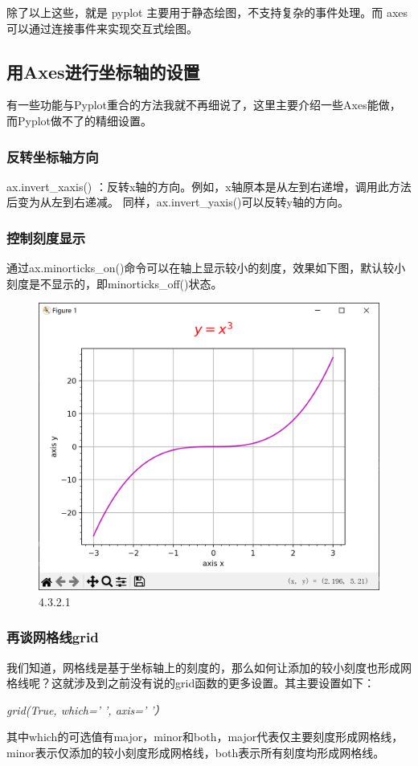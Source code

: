 \documentclass[12pt]{article}
\begin{document}
除了以上这些，就是 pyplot 主要用于静态绘图，不支持复杂的事件处理。而 axes 可以通过连接事件来实现交互式绘图。


\subsection{用Axes进行坐标轴的设置}
有一些功能与Pyplot重合的方法我就不再细说了，这里主要介绍一些Axes能做，而Pyplot做不了的精细设置。
\subsubsection{反转坐标轴方向}

ax.invert\_xaxis()  ：反转x轴的方向。例如，x轴原本是从左到右递增，调用此方法后变为从左到右递减。
同样，ax.invert\_yaxis()可以反转y轴的方向。

\subsubsection{控制刻度显示}

通过ax.minorticks\_on()命令可以在轴上显示较小的刻度，效果如下图，默认较小刻度是不显示的，即minorticks\_off()状态。
\begin{figure}[H]
    \centering
    \includegraphics[width=0.5\linewidth]{Axes控制坐标轴 Pic1.png}
    \caption{4.3.2.1}
    \label{fig:enter-label}
\end{figure}

\subsubsection{再谈网格线grid}
我们知道，网格线是基于坐标轴上的刻度的，那么如何让添加的较小刻度也形成网格线呢？这就涉及到之前没有说的grid函数的更多设置。其主要设置如下：

\textit{\large grid(True, which=' ', axis=' '）}

其中which的可选值有major，minor和both，major代表仅主要刻度形成网格线，minor表示仅添加的较小刻度形成网格线，both表示所有刻度均形成网格线。
\end{document}
